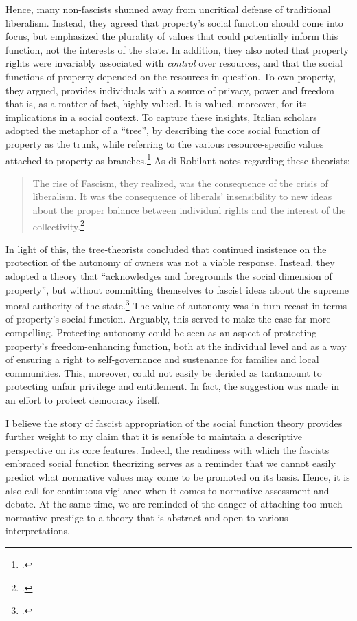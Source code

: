 \documentclass[12pt,a4paper]{book} %
\begin{document}
Hence, many non-fascists shunned away from uncritical defense of traditional liberalism. Instead, they agreed that property's social function should come into focus, but emphasized the plurality of values that could potentially inform this function, not the interests of the state. In addition, they also noted that property rights were invariably associated with {\it control} over resources, and that the social functions of property depended on the resources in question. To own property, they argued, provides individuals with a source of privacy, power and freedom that is, as a matter of fact, highly valued. It is valued, moreover, for its implications in a social context. To capture these insights, Italian scholars adopted the metaphor of a ``tree'', by describing the core social function of property as the trunk, while referring to the various resource-specific values attached to property as branches.\footcite[894-916]{robilant13} As di Robilant notes regarding these theorists:

\begin{quote}
The rise of Fascism, they realized, was the
consequence of the crisis of liberalism. It was the consequence of liberals' insensibility to new ideas about the proper balance between individual rights and the interest of the collectivity.\footcite[907]{robilant13}
\end{quote}

In light of this, the tree-theorists concluded that continued insistence on the protection of the autonomy of owners was not a viable response. Instead, they adopted a theory that ``acknowledges and foregrounds the social dimension of property'', but without committing themselves to fascist ideas about the supreme moral authority of the state.\footcite[907]{robilant13} The value of autonomy was in turn recast in terms of property's social function. Arguably, this served to make the case far more compelling. Protecting autonomy could be seen as an aspect of protecting property's freedom-enhancing function, both at the individual level and as a way of ensuring a right to self-governance and sustenance for families and local communities. This, moreover, could not easily be derided as tantamount to protecting unfair privilege and entitlement. In fact, the suggestion was made in an effort to protect democracy itself.

I believe the story of fascist appropriation of the social function theory provides further weight to my claim that it is sensible to  maintain a descriptive perspective on its core features. Indeed, the readiness with which the fascists embraced social function theorizing serves as a reminder that we cannot easily predict what normative values may come to be promoted on its basis. Hence, it is also call for continuous vigilance when it comes to normative assessment and debate. At the same time, we are reminded of the danger of attaching too much normative prestige to a theory that is abstract and open to various interpretations.
\end{document}

